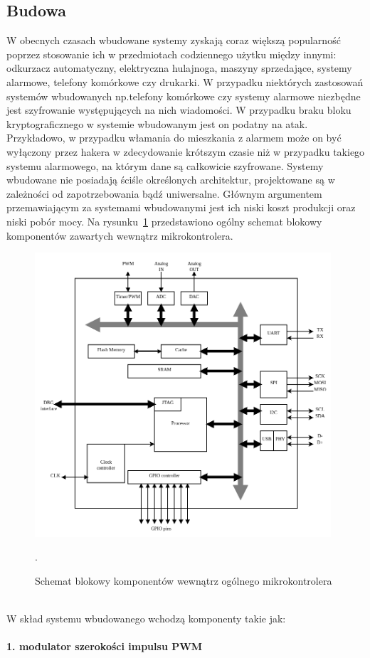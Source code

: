 \documentclass[12p]{article}
\begin{document}
\subsection{Budowa }
\quad W obecnych czasach wbudowane systemy zyskają coraz większą popularność poprzez stosowanie ich w przedmiotach codziennego użytku między innymi: odkurzacz automatyczny, elektryczna hulajnoga, maszyny sprzedające, systemy alarmowe, telefony komórkowe czy drukarki. W przypadku niektórych zastosowań systemów wbudowanych np.telefony komórkowe czy systemy alarmowe niezbędne jest szyfrowanie występujących na nich wiadomości. W przypadku braku bloku kryptograficznego w systemie wbudowanym jest on podatny na atak. Przykładowo, w przypadku włamania do mieszkania z alarmem może on być wyłączony przez hakera w zdecydowanie krótszym czasie niż w przypadku takiego systemu alarmowego, na którym dane są całkowicie szyfrowane. Systemy wbudowane nie posiadają ściśle określonych architektur, projektowane są w zależności od zapotrzebowania bądź uniwersalne. Głównym argumentem przemawiającym za systemami wbudowanymi jest ich niski koszt produkcji oraz niski pobór mocy. Na rysunku~\ref{es} przedstawiono ogólny schemat blokowy komponentów zawartych wewnątrz mikrokontrolera.
\begin{figure}[H]
\centering
\includegraphics[width=11cm]{es.png}
\caption{Schemat blokowy komponentów wewnątrz ogólnego mikrokontrolera ~\cite{es}}.\label{es}
\end{figure}
W skład systemu wbudowanego wchodzą komponenty takie jak:

\paragraph{1. modulator szerokości impulsu PWM} \mbox{} \\
\end{document}
